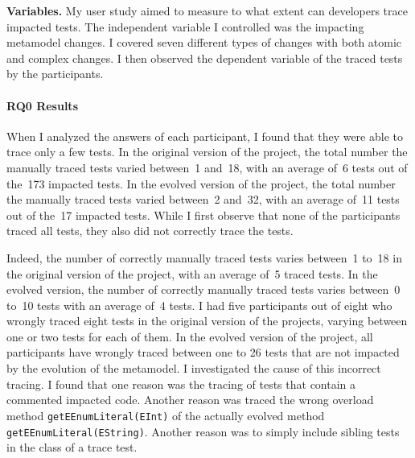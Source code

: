 {	\textbf{Variables.} My user study aimed to measure to what extent can developers trace impacted tests. The independent variable I controlled was the impacting metamodel changes. I covered seven different types of changes with both atomic and complex changes. 
	I then observed the dependent variable of the traced tests by the participants. 
	
	\paragraph{RQ0 Results}
	When I analyzed the answers of each participant, I found that they were able to trace only a few tests. In the original version of the project, the total number the manually traced tests varied between~1 and~18, with an average of~6 tests out of the~173 impacted tests.   
	In the evolved version of the project, the total number the manually traced tests varied between~2 and~32, with an average of~11 tests out of the~17 impacted tests.   
	While I first observe that none of the participants traced all tests, they also did not correctly trace the tests. 
	
	Indeed, the number of correctly manually traced tests varies between~1 to~18 in the original version of the project, with an average of~5 traced tests. In the evolved version, the number of correctly manually traced tests varies between~0 to~10 tests with an average of~4 tests. 
	I had five participants out of eight who wrongly traced eight tests in the original version of the projects, varying between one or two tests for each of them. In the evolved version of the project, all participants have wrongly traced between one to 26 tests that are not impacted by the evolution of the metamodel. 
	I investigated the cause of this incorrect tracing. I found that one reason was the tracing  of tests that contain a commented impacted code. 
	Another reason was traced the wrong overload method \texttt{getEEnumLiteral(EInt)} of the actually evolved method \texttt{getEEnumLiteral(EString)}. Another reason was to simply include sibling tests in the class of a trace test. 
	
}
